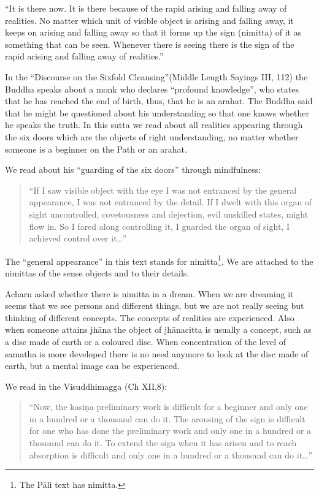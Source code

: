 \documentclass{book}
\begin{document}
``It is there now. It is
there because of the rapid arising and
falling away of
realities. No matter which unit of visible object is
arising and falling
away, it keeps on arising and falling away so
that it forms up the
sign (nimitta) of it as something that can be
seen. Whenever there is
seeing there is the sign of the rapid arising
and falling away of
realities.''

In the
``Discourse on the Sixfold
Cleansing''(Middle Length Sayings III,
112) the Buddha speaks about a monk who declares
``profound
knowledge'', who states that he has
reached the end of birth, thus, that he is an arahat. The Buddha said
that he might be questioned about his understanding so that one knows
whether he speaks the truth. In this sutta we read about all realities
appearing through the six doors which are the objects of right
understanding, no matter whether someone is a beginner on the Path or an
arahat. 

We read about his
``guarding of the six doors''
through mindfulness:

\begin{quote}
``If I saw visible
object with the eye I was not entranced by the general appearance, I was
not entranced by the detail. If I dwelt with this organ of sight
uncontrolled, covetousness and dejection, evil unskilled states, might
flow in. So I fared along controlling it, I guarded the organ of sight,
I achieved control over it\ldots''

\end{quote}

The ``general appearance'' in this text
stands for
nimitta\footnote{The
Pāli text has nimitta.}. We are
attached to the nimittas of the sense objects and to their details. 

Acharn asked whether there is nimitta in a
dream. When we are dreaming it seems that we see persons and different
things, but we are not really seeing but thinking of different concepts.
The concepts of realities are experienced. Also when someone attains
jhāna the object of jhānacitta is usually a concept, such as a disc made
of earth or a coloured disc. When concentration of the level of samatha
is more developed there is no need anymore to look at the disc made of
earth, but a mental image can be experienced. 

We read in the Visuddhimagga (Ch XII,8):

\begin{quote}
``Now, the
kasiṇa preliminary work is difficult
for a beginner and only one in a hundred or a thousand can do it. The
arousing of the sign is difficult for one who has done the preliminary
work and only one in a hundred or a thousand can do it. To extend the
sign when it has arisen and to reach absorption is difficult and only
one in a hundred or a thousand can do it\ldots''
\end{quote}
\end{document}
